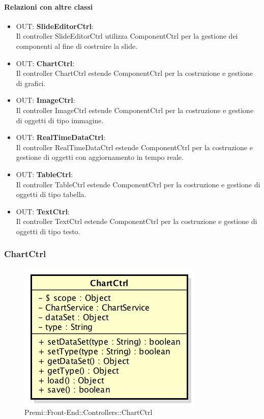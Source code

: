 	\paragraph{Relazioni con altre classi}
	\begin{itemize}
	 \item OUT: \textbf{SlideEditorCtrl}:\\
		Il controller SlideEditorCtrl utilizza ComponentCtrl per la gestione dei componenti al fine di costruire la slide.
	 \item OUT: \textbf{ChartCtrl}:\\
	 	Il controller ChartCtrl estende ComponentCtrl per la costruzione e gestione di grafici.
	 \item OUT: \textbf{ImageCtrl}:\\
		Il controller ImageCtrl estende ComponentCtrl per la costruzione e gestione di oggetti di tipo immagine.
	 \item OUT: \textbf{RealTimeDataCtrl}:\\
		Il controller RealTimeDataCtrl estende ComponentCtrl per la costruzione e gestione di oggetti con aggiornamento in tempo reale.
	 \item OUT: \textbf{TableCtrl}:\\
		Il controller TableCtrl estende ComponentCtrl per la costruzione e gestione di oggetti di tipo tabella.
	 \item OUT: \textbf{TextCtrl}:\\
		Il controller TextCtrl estende ComponentCtrl per la costruzione e gestione di oggetti di tipo testo.
	
	\end{itemize}
	
\newpage
\subsubsection{ChartCtrl}
\begin{figure}[h]
	\centering
	\includegraphics[width=0.4\linewidth]{img/premi_front_end_controllers_chartctrl}
	\caption[Premi::Front-End::Controllers::ChartCtrl]{Premi::Front-End::Controllers::ChartCtrl}
\end{figure}
